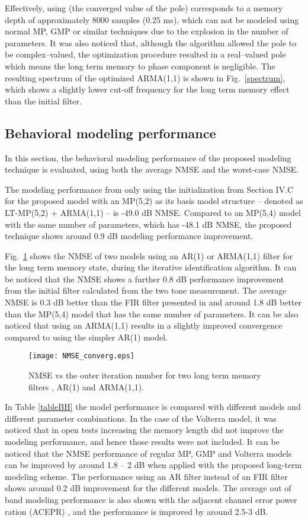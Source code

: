 \documentclass[journal]{IEEEtran}
\begin{document}
Effectively, using  (the converged value of the pole) corresponds to a memory depth of approximately 8000 samples (0.25 ms), which can not be modeled using normal MP, GMP or similar techniques due to the explosion in the number of parameters. It was also noticed that, although the algorithm allowed the pole to be complex--valued, the optimization procedure resulted in a real--valued pole which means the long term memory to phase component is negligible. The resulting spectrum of the optimized ARMA(1,1) is shown in Fig.~\ref{spectrum}, which shows a slightly lower cut-off frequency for the long term memory effect than the initial filter.

\subsection{Behavioral modeling performance}
In this section, the behavioral modeling performance of the proposed modeling technique is evaluated, using both the average NMSE and the worst-case NMSE.

The modeling performance from only using the initialization from Section IV.C for the proposed model with an MP(5,2) as its basis model structure -- denoted as LT-MP(5,2) + ARMA(1,1) -- is -49.0 dB NMSE. Compared to an MP(5,4) model with the same number of parameters, which has -48.1 dB NMSE, the proposed technique shows around 0.9 dB modeling performance improvement.

Fig.~\ref{NMSE_converge} shows the NMSE of two models using an AR(1) or ARMA(1,1) filter for the long term memory state, during the iterative identification algorithm. It can be noticed that the NMSE shows a further 0.8 dB performance improvement from the initial filter calculated from the two tone measurement. The average NMSE is 0.3 dB better than the FIR filter presented in \cite{soltani2012} and around 1.8 dB better than the MP(5,4) model that has the same number of parameters. It can be also noticed that using an ARMA(1,1) results in a slightly improved convergence compared to using the simpler AR(1) model.
\begin{figure}
\centering
\texttt{[image: NMSE\_converg.eps]}
\caption{NMSE vs the outer iteration number for two long term memory filters , AR(1) and ARMA(1,1).} \label{NMSE_converge}
\end{figure}

In Table \ref{tableBH} the model performance is compared with different models and different parameter combinations. In the case of the Volterra model, it was noticed that in open tests increasing the memory length did not improve the modeling performance, and hence those results were not included. It can be noticed that the NMSE performance of regular MP, GMP and Volterra models can be improved by around 1.8 -- 2 dB when applied with the proposed long-term modeling scheme. The performance using an AR filter instead of an FIR filter shows around 0.2 dB improvement for the different models. The average out of band modeling performance is also shown with the adjacent channel error power ration (ACEPR) \cite{soltani}, and the performance is improved by around 2.5-3 dB.
\end{document}
